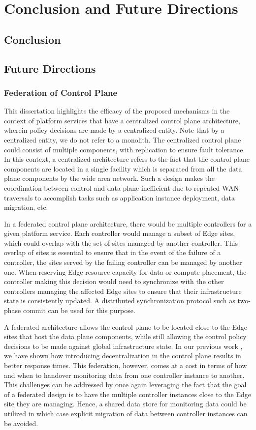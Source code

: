 \chapter{Conclusion and Future Directions}
\label{sec:conclusion}
\section{Conclusion}
\section{Future Directions}
\subsection{Federation of Control Plane}
This dissertation highlights the efficacy of the proposed mechanisms in the context of platform services that have a centralized control plane architecture, wherein policy decisions are made by a centralized entity. Note that by a centralized entity, we do not refer to a monolith. The centralized control plane could consist of multiple components, with replication to ensure fault tolerance. In this context, a centralized architecture refers to the fact that the control plane components are located in a single facility which is separated from all the data plane components by the wide area network. Such a design makes the coordination between control and data plane inefficient due to repeated WAN traversals to accomplish tasks such as application instance deployment, data migration, etc.
\par In a federated control plane architecture, there would be multiple controllers for a given platform service. Each controller would manage a subset of Edge sites, which could overlap with the set of sites managed by another controller. This overlap of sites is essential to ensure that in the event of the failure of a controller, the sites served by the failing controller can be managed by another one. When reserving Edge resource capacity for data or compute placement, the controller making this decision would need to synchronize with the other controllers managing the affected Edge sites to ensure that their infrastructure state is consistently updated. A distributed synchronization protocol such as two-phase commit can be used for this purpose.
\par A federated architecture allows the control plane to be located close to the Edge sites that host the data plane components, while still allowing the control policy decisions to be made against global infrastructure state. In our previous work \cite{oneedge}, we have shown how introducing decentralization in the control plane results in better response times. This federation, however, comes at a cost in terms of how and when to handover monitoring data from one controller instance to another. This challenges can be addressed by once again leveraging the fact that the goal of a federated design is to have the multiple controller instances close to the Edge site they are managing. Hence, a shared data store for monitoring data could be utilized in which case explicit migration of data between controller instances can be avoided.

